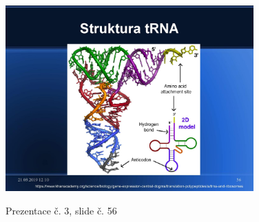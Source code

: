 \documentclass[DIV=8]{scrreprt}
\begin{document}
\begin{figure}
    \caption{Prezentace č. 3, slide č. 56}
    \includegraphics[width=0.85\textwidth]{slides-3/slide-56.jpg}
    \centering
    \label{slides-3-slide-56}
\end{figure}
\end{document}
